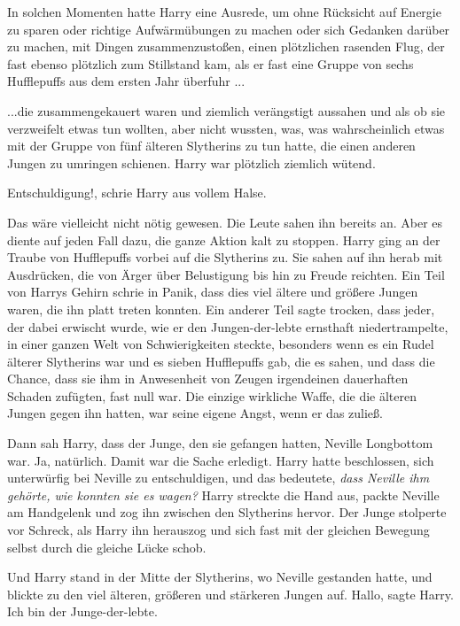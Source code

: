 In solchen Momenten hatte Harry eine Ausrede, um ohne Rücksicht auf Energie zu
sparen oder richtige Aufwärmübungen zu machen oder sich Gedanken darüber zu
machen, mit Dingen zusammenzustoßen, einen plötzlichen rasenden Flug, der fast
ebenso plötzlich zum Stillstand kam, als er fast eine Gruppe von sechs
Hufflepuffs aus dem ersten Jahr überfuhr ...

...die zusammengekauert waren und ziemlich verängstigt aussahen und als ob sie
verzweifelt etwas tun wollten, aber nicht wussten, was, was wahrscheinlich etwas
mit der Gruppe von fünf älteren Slytherins zu tun hatte, die einen anderen
Jungen zu umringen schienen. Harry war plötzlich ziemlich wütend.

\glqq{}Entschuldigung!\grqq{}, schrie Harry aus vollem Halse.

Das wäre vielleicht nicht nötig gewesen. Die Leute sahen ihn bereits an. Aber es
diente auf jeden Fall dazu, die ganze Aktion kalt zu stoppen. Harry ging an der
Traube von Hufflepuffs vorbei auf die Slytherins zu. Sie sahen auf ihn herab mit
Ausdrücken, die von Ärger über Belustigung bis hin zu Freude reichten. Ein Teil
von Harrys Gehirn schrie in Panik, dass dies viel ältere und größere Jungen
waren, die ihn platt treten konnten. Ein anderer Teil sagte trocken, dass jeder,
der dabei erwischt wurde, wie er den Jungen-der-lebte ernsthaft niedertrampelte,
in einer ganzen Welt von Schwierigkeiten steckte, besonders wenn es ein Rudel
älterer Slytherins war und es sieben Hufflepuffs gab, die es sahen, und dass die
Chance, dass sie ihm in Anwesenheit von Zeugen irgendeinen dauerhaften Schaden
zufügten, fast null war. Die einzige wirkliche Waffe, die die älteren Jungen
gegen ihn hatten, war seine eigene Angst, wenn er das zuließ.

Dann sah Harry, dass der Junge, den sie gefangen hatten, Neville Longbottom war.
Ja, natürlich. Damit war die Sache erledigt. Harry hatte beschlossen, sich
unterwürfig bei Neville zu entschuldigen, und das bedeutete, \emph{dass Neville
ihm gehörte, wie konnten sie es wagen?} Harry streckte die Hand aus, packte
Neville am Handgelenk und zog ihn zwischen den Slytherins hervor. Der Junge
stolperte vor Schreck, als Harry ihn herauszog und sich fast mit der gleichen
Bewegung selbst durch die gleiche Lücke schob.

Und Harry stand in der Mitte der Slytherins, wo Neville gestanden hatte, und
blickte zu den viel älteren, größeren und stärkeren Jungen auf. \glqq{}
Hallo\grqq{}, sagte Harry. \glqq{}Ich bin der Junge-der-lebte.\grqq{}


